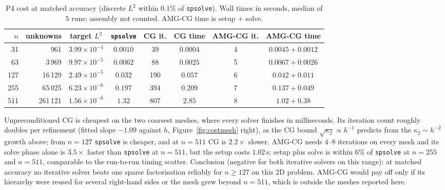 \documentclass[11pt,a4paper]{article}
\begin{document}
\begin{table}[H]
\centering
\caption{P4 cost at matched accuracy (discrete \(L^2\) within \(0.1\%\) of \texttt{spsolve}). Wall times in seconds, median of \(5\) runs; assembly not counted. AMG-CG time is setup \(+\) solve.}
\label{tab:costmesh}
\begin{tabular}{@{}rrcccccc@{}}
\toprule
\(n\) & unknowns & target \(L^2\) & \texttt{spsolve} & CG it. & CG time & AMG-CG it. & AMG-CG time\\
\midrule
31  & 961     & \(3.99\times 10^{-4}\) & \(0.0010\) & 39  & \(0.0004\) & 4 & \(0.0045+0.0012\)\\
63  & 3\,969  & \(9.97\times 10^{-5}\) & \(0.0062\) & 88  & \(0.0025\) & 5 & \(0.0067+0.0026\)\\
127 & 16\,129 & \(2.49\times 10^{-5}\) & \(0.032\)  & 190 & \(0.057\)  & 6 & \(0.042+0.011\)\\
255 & 65\,025 & \(6.23\times 10^{-6}\) & \(0.197\)  & 394 & \(0.209\)  & 7 & \(0.137+0.049\)\\
511 & 261\,121 & \(1.56\times 10^{-6}\) & \(1.32\)  & 807 & \(2.85\)   & 8 & \(1.02+0.38\)\\
\bottomrule
\end{tabular}
\end{table}

Unpreconditioned CG is cheapest on the two coarsest meshes, where every solver finishes in milliseconds.
Its iteration count roughly doubles per refinement (fitted slope \(-1.09\) against \(h\), Figure~\ref{fig:costmesh} right), as the CG bound \(\sqrt{\kappa_2}\propto h^{-1}\) predicts from the \(\kappa_2\sim h^{-2}\) growth above; from \(n=127\) \texttt{spsolve} is cheaper, and at \(n=511\) CG is \(2.2\times\) slower.
AMG-CG needs \(4\)--\(8\) iterations on every mesh and its solve phase alone is \(3.5\times\) faster than \texttt{spsolve} at \(n=511\), but the setup costs \(1.02\,\mathrm{s}\); setup plus solve is within \(6\%\) of \texttt{spsolve} at \(n=255\) and \(n=511\), comparable to the run-to-run timing scatter.
Conclusion (negative for both iterative solvers on this range): at matched accuracy no iterative solver beats one sparse factorisation reliably for \(n\ge 127\) on this 2D problem.
AMG-CG would pay off only if its hierarchy were reused for several right-hand sides or the mesh grew beyond \(n=511\), which is outside the meshes reported here.
\end{document}
